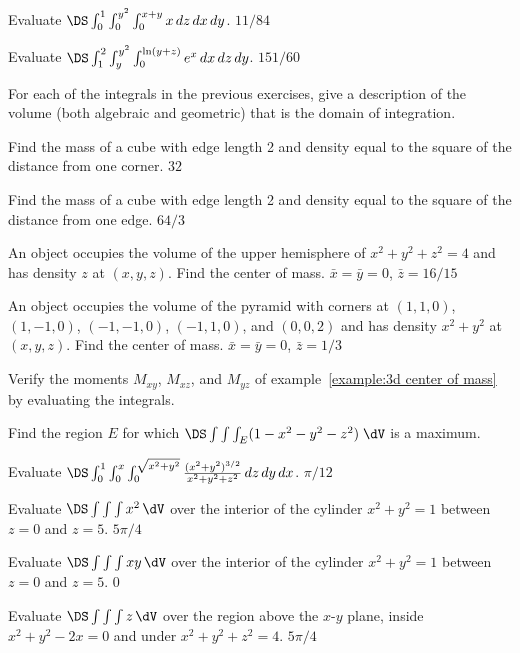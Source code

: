 \begin{multicols}{2}
\problem Evaluate $\DS\int_{0}^{1}\int_{0}^{y^2}\int_{0}^{x+y} %
x\,dz\,dx\,dy$.
\answer
$11/84$
\endanswer

\problem Evaluate $\DS\int_{1}^{2}\int_{y}^{y^2}\int_{0}^{\ln(y+z)} %
e^x\,dx\,dz\,dy$.
\answer
$151/60$
\endanswer

\problem For each of the integrals in the previous exercises, give a %
description of the volume (both algebraic and geometric) that is the
domain of integration.


\problem Find the mass of a cube with edge length 2 and density equal %
to the square of the distance from one corner.
\answer
$32$
\endanswer

\problem Find the mass of a cube with edge length 2 and density equal %
to the square of the distance from one edge.
\answer
$64/3$
\endanswer

\problem An object occupies the volume of the upper hemisphere of  %
$x^2+y^2+z^2=4$ and has density $z$ at $(x,y,z)$. Find the center of mass.
\answer
$\bar x=\bar y=0$, $\bar z=16/15$
\endanswer

\problem An object occupies the volume of the pyramid with corners at  %
$(1,1,0)$, $(1,-1,0)$, $(-1,-1,0)$, $(-1,1,0)$, and $(0,0,2)$ and has
density $x^2+y^2$ at $(x,y,z)$. Find the center of mass.
\answer
$\bar x=\bar y=0$, $\bar z=1/3$
\endanswer

\problem Verify the moments $M_{xy}$, $M_{xz}$, and $M_{yz}$ %
of example~\ref{example:3d center of mass} by evaluating the
integrals. 


\problem Find the region $E$ for which $\DS\tint{E} %
(1-x^2-y^2-z^2) \; \dV $ is a maximum.






\problem Evaluate $\DS\int_{0}^{1}\int_{0}^{x}\int_{0}^{\sqrt{x^2+y^2}} %
{(x^2+y^2)^{3/2}\over x^2+y^2+z^2}\,dz\,dy\,dx$.
\answer
$\pi/12$
\endanswer

\problem Evaluate $\DS\int\int\int x^2\,\dV $ %
over the interior of the cylinder $x^2+y^2=1$ between $z=0$ and $z=5$.
\answer
$5\pi/4$
\endanswer

\problem Evaluate $\DS\int\int\int xy\,\dV $ %
over the interior of the cylinder $x^2+y^2=1$ between $z=0$ and $z=5$.
\answer
$0$
\endanswer

\problem Evaluate $\DS\int\int\int z\,\dV $ %
over the region above the $x$-$y$ plane, inside $x^2+y^2-2x=0$ and
under $x^2+y^2+z^2=4$.
\answer
$5\pi/4$
\endanswer


\end{multicols}
